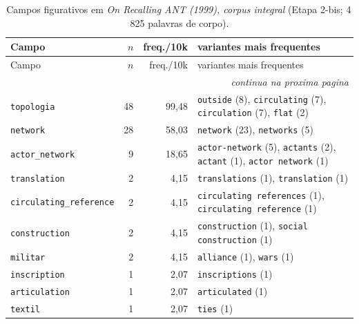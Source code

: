 {\footnotesize
\begin{longtable}{@{}l r r >{\raggedright\arraybackslash}p{6.4cm}@{}}
\caption{Campos figurativos em \emph{On Recalling ANT (1999), corpus integral} (Etapa 2-bis; 4\,825 palavras de corpo).}\label{tab:campos-rec99i}\\
\toprule
Campo & $n$ & freq./10k & variantes mais frequentes \\
\midrule \endfirsthead
\toprule Campo & $n$ & freq./10k & variantes mais frequentes \\ \midrule \endhead
\midrule \multicolumn{4}{r}{\footnotesize \emph{continua na proxima pagina}}\\ \endfoot
\bottomrule \endlastfoot
\texttt{topologia} & 48 & 99{,}48 & \texttt{outside} (8), \texttt{circulating} (7), \texttt{circulation} (7), \texttt{flat} (2) \\
\texttt{network} & 28 & 58{,}03 & \texttt{network} (23), \texttt{networks} (5) \\
\texttt{actor\_network} & 9 & 18{,}65 & \texttt{actor-network} (5), \texttt{actants} (2), \texttt{actant} (1), \texttt{actor network} (1) \\
\texttt{translation} & 2 & 4{,}15 & \texttt{translations} (1), \texttt{translation} (1) \\
\texttt{circulating\_reference} & 2 & 4{,}15 & \texttt{circulating references} (1), \texttt{circulating reference} (1) \\
\texttt{construction} & 2 & 4{,}15 & \texttt{construction} (1), \texttt{social construction} (1) \\
\texttt{militar} & 2 & 4{,}15 & \texttt{alliance} (1), \texttt{wars} (1) \\
\texttt{inscription} & 1 & 2{,}07 & \texttt{inscriptions} (1) \\
\texttt{articulation} & 1 & 2{,}07 & \texttt{articulated} (1) \\
\texttt{textil} & 1 & 2{,}07 & \texttt{ties} (1) \\
\end{longtable}}

